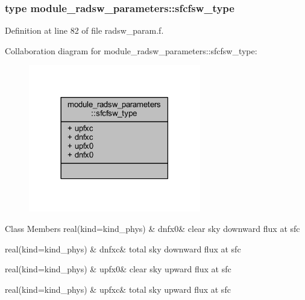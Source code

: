 \subsubsection{type module\+\_\+radsw\+\_\+parameters\+:\+:sfcfsw\+\_\+type}


Definition at line 82 of file radsw\+\_\+param.\+f.



Collaboration diagram for module\+\_\+radsw\+\_\+parameters\+:\+:sfcfsw\+\_\+type\+:\nopagebreak
\begin{figure}[H]
\begin{center}
\leavevmode
\includegraphics[width=213pt]{structmodule__radsw__parameters_1_1sfcfsw__type__coll__graph}
\end{center}
\end{figure}
\begin{DoxyFields}{Class Members}
real(kind=kind\+\_\+phys)\hypertarget{namespacemodule__radsw__parameters_a2b1a4d8e0e93332fd08f3aa6b68fb141}{}\label{namespacemodule__radsw__parameters_a2b1a4d8e0e93332fd08f3aa6b68fb141}
&
dnfx0&
clear sky downward flux at sfc \\
\hline

real(kind=kind\+\_\+phys)\hypertarget{namespacemodule__radsw__parameters_a0e5e6bfe14ffd1a9c1c8abfc730db4ba}{}\label{namespacemodule__radsw__parameters_a0e5e6bfe14ffd1a9c1c8abfc730db4ba}
&
dnfxc&
total sky downward flux at sfc \\
\hline

real(kind=kind\+\_\+phys)\hypertarget{namespacemodule__radsw__parameters_a6bfa85d5917ebc4ebc4ef079e3cf3eca}{}\label{namespacemodule__radsw__parameters_a6bfa85d5917ebc4ebc4ef079e3cf3eca}
&
upfx0&
clear sky upward flux at sfc \\
\hline

real(kind=kind\+\_\+phys)\hypertarget{namespacemodule__radsw__parameters_a89e2285e3148921e989cb27cda4294a1}{}\label{namespacemodule__radsw__parameters_a89e2285e3148921e989cb27cda4294a1}
&
upfxc&
total sky upward flux at sfc \\
\hline

\end{DoxyFields}
\label{structmodule__radsw__parameters_1_1topfsw__type}
\hypertarget{namespacemodule__radsw__parameters_structmodule__radsw__parameters_1_1topfsw__type}{}
